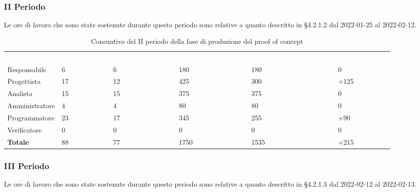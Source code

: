 \subsubsection{II Periodo}
Le ore di lavoro che sono state sostenute durante questo periodo sono relative a quanto descritto in §4.2.1.2 dal 2022-01-25 al 2022-02-12.

\begin{table}[!htbp]
\begin{center}
\renewcommand{\arraystretch}{1.5}
\begin{tabular}{ m{}<{\centering}  m{}<{\centering} m{}<{\centering} m{}<{\centering} m{}<{\centering} m{}<{\centering}}
	\rowcolor{darkblue}
	\textcolor{white}{\textbf{Ruolo}} & \textcolor{white}{\textbf{Ore Effettive}} & \textcolor{white}{\textbf{Ore Preventivate}}&\textcolor{white}{\textbf{Costo Effettivo (\euro) }}&\textcolor{white}{\textbf{Costo Preventivato (\euro)}}&\textcolor{white}{\textbf{Differenza (\euro)}}\\ 
	
	Responsabile  & 6 & 6 & 180 & 180 & 0 \\	
	
	Progettista & 17 & 12 & 425 & 300 & +125 \\
	
	Analista & 15 & 15 & 375 & 375 & 0 \\

	Amministratore & 4 & 4 & 80 & 80 & 0 \\
	
	Programmatore & 23 & 17 & 345 & 255 &  +90 \\
	
	Verificatore & 0 & 0 & 0 & 0 & 0 \\
	
	\textbf{Totale} & 88 & 77 & 1750 & 1535 & +215 \\
	
\end{tabular}
\caption{Consuntivo del II periodo della fase di produzione del proof of concept}
\end{center}
\end{table}


\subsubsection{III Periodo}
Le ore di lavoro che sono state sostenute durante questo periodo sono relative a quanto descritto in §4.2.1.3  dal 2022-02-12 al 2022-02-13.

